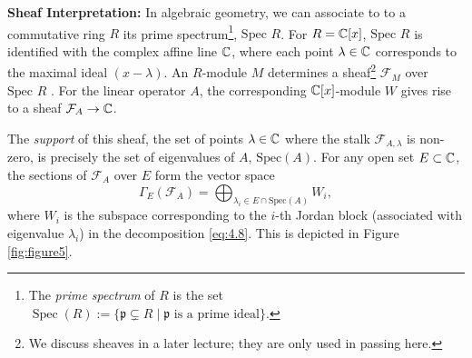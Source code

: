\textbf{Sheaf Interpretation:} In algebraic geometry, we can associate to to a commutative ring $R$ its prime spectrum\footnote{The \textit{prime spectrum} of $R$ is the set $\operatorname{Spec}(R) := \{ \mathfrak{p} \subsetneq R \mid \mathfrak{p} \text{ is a prime ideal} \}.$}, $\text{Spec } R$. For $R = \mathbb{C}[x]$, $\text{Spec } R$ is identified with the complex affine line $\mathbb{C}$, where each point $\lambda \in \mathbb{C}$ corresponds to the maximal ideal $(x-\lambda)$. An $R$-module $M$ determines a sheaf\footnote{We discuss sheaves in a later lecture; they are only used in passing here.} $\mathcal{F}_M$ over $\text{Spec } R$ . For the linear operator $A$, the corresponding $\mathbb{C}[x]$-module $W$ gives rise to a sheaf $\mathcal{F}_A \to \mathbb{C}$.

The \textit{support} of this sheaf, the set of points $\lambda \in \mathbb{C}$ where the stalk $\mathcal{F}_{A,\lambda}$ is non-zero, is precisely the set of eigenvalues of $A$, $\text{Spec}(A)$. For any open set $E \subset \mathbb{C}$, the sections of $\mathcal{F}_A$ over $E$ form the vector space
\begin{equation} \label{eq:4.9}
\Gamma_E(\mathcal{F}_A) = \bigoplus_{\lambda_i \in E \cap \text{Spec}(A)} W_i,
\end{equation}
where $W_i$ is the subspace corresponding to the $i$-th Jordan block (associated with eigenvalue $\lambda_i$) in the decomposition \eqref{eq:4.8}. This is depicted in Figure \ref{fig:figure5}.

